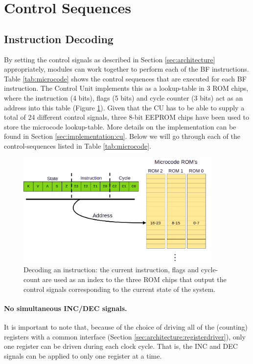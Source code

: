 \section{Control Sequences} \label{sec:sequences}
\subsection{Instruction Decoding}
By setting the control signals as described in Section \ref{sec:architecture} appropriately, modules can work together to perform each of the BF instructions. Table \ref{tab:microcode} shows the control sequences that are executed for each BF instruction. The Control Unit implements this as a lookup-table in 3 ROM chips, where the instruction (4 bits), flags (5 bits) and cycle counter (3 bits) act as an address into this table (Figure \ref{fig:decoder}). Given that the CU has to be able to supply a total of 24 different control signals, three 8-bit EEPROM chips have been used to store the microcode lookup-table. More details on the implementation can be found in Section \ref{sec:implementation:cu}. Below we will go through each of the control-sequences listed in Table \ref{tab:microcode}.

\begin{figure}[H]
  \centering
  \includegraphics[width=0.9\textwidth]{img/instruction_decoding}
  \caption{Decoding an instruction: the current instruction, flags and cycle-count are used as an index to the three ROM chips that output the control signals corresponding to the current state of the system.}
  \label{fig:decoder}
\end{figure}

\paragraph{No simultaneous INC/DEC signals.} It is important to note that, because of the choice of driving all of the (counting) registers with a common interface (Section \ref{sec:architecture:registerdriver}), only one register can be driven during each clock cycle. That is, the INC and DEC signals can be applied to only one register at a time. 



